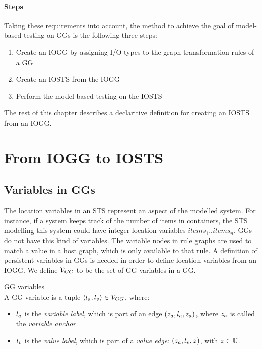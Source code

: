 \paragraph*{Steps} Taking these requirements into account, the method to achieve the goal of model-based testing on GGs is the following three steps:
\begin{enumerate}
\item Create an IOGG by assigning I/O types to the graph transformation rules of a GG
\item Create an IOSTS from the IOGG
\item Perform the model-based testing on the IOSTS
\end{enumerate}
The rest of this chapter describes a declaritive definition for creating an IOSTS from an IOGG.

\section{From IOGG to IOSTS}\label{sec:algorithm}
\subsection{Variables in GGs} 
The location variables in an STS represent an aspect of the modelled system. For instance, if a system keeps track of the number of items in containers, the STS modelling this system could have integer location variables $\mathit{items}_1..\mathit{items}_n$. GGs do not have this kind of variables. The variable nodes in rule graphs are used to match a value in a host graph, which is only available to that rule. A definition of persistent variables in GGs is needed in order to define location variables from an IOGG. We define $\mathcal{V}_{GG}$ to be the set of GG variables in a GG.

\vspace{10px}
\begin{definition}\label{def:gg_vars} GG variables \\
A GG variable is a tuple $\langle l_a, l_v\rangle \in \mathcal{V}_{GG}$, where:
\begin{itemize}
\item {}$l_a$ is the \textit{variable label}, which is part of an edge $(z_a, l_a, z_a)$, where $z_a$ is called the \textit{variable anchor}
\item {}$l_v$ is the \textit{value label}, which is part of a \textit{value edge}: $(z_a, l_v, z)$, with $z \in \mathbb{U}$.
\end{itemize}
\end{definition}
\vspace{10px}

